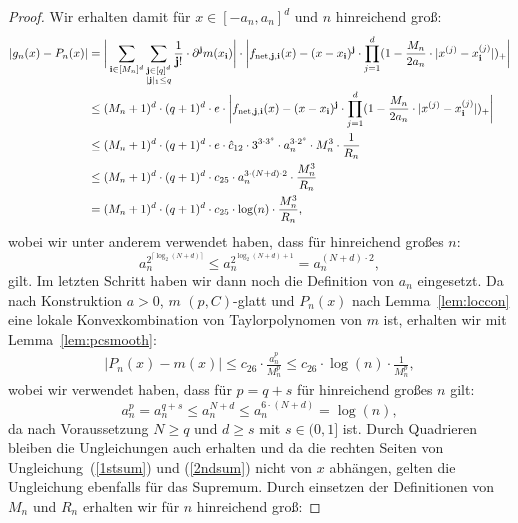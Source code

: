 \begin{proof}
Wir erhalten damit für $x \in [-a_n ,a_n]^d$ und $n$ hinreichend groß:
\begin{equation}
\label{1stsum}
\begin{split}
 |g_n(x) - P_n(x)| 
& = \bigg| \sum_{\mathbf{i} \in [M_n]^d} \sum_{\substack{ \mathbf{j} \in [q]^d \\ |\mathbf{j}|_1 \leq q}} \frac{1}{\mathbf{j}!} \cdot \partial^{\mathbf{j}} m (x_{\mathbf{i}}) \bigg| \cdot \bigg| f_{\mathrm{net},\mathbf{j},\mathbf{i}}(x) - (x - x_{\mathbf{i}})^{\mathbf{j}} \cdot \prod_{j = 1}^d(1 - \frac{M_n}{2a_n} \cdot |x^{(j)} - x_{\mathbf{i}}^{(j)}|)_+ \bigg| \\
& \leq (M_n + 1)^d \cdot (q + 1)^d \cdot e \cdot \bigg| f_{\mathrm{net},\mathbf{j},\mathbf{i}}(x) - (x - x_{\mathbf{i}})^{\mathbf{j}} \cdot \prod_{j = 1}^d(1 - \frac{M_n}{2a_n} \cdot |x^{(j)} - x_{\mathbf{i}}^{(j)}|)_+ \bigg| \\
& \leq (M_n + 1)^d \cdot (q + 1)^d \cdot e \cdot \hat{c}_{12} \cdot 3^{3 \cdot 3^s} \cdot a_n^{3 \cdot 2^s} \cdot M_n^3 \cdot \frac{1}{R_n} \\
& \leq (M_n + 1)^d \cdot (q + 1)^d \cdot c_{25}\cdot a_n^{3 \cdot (N + d) \cdot 2} \cdot \frac{M_n^3}{R_n} \\
& =  (M_n + 1)^d \cdot (q + 1)^d \cdot c_{25}\cdot \log(n) \cdot \frac{M_n^3}{R_n},
\end{split}
\end{equation}
wobei wir unter anderem verwendet haben, dass für hinreichend großes $n$:
$$a_n^{2^{\lceil\log_2(N + d)\rceil}} \leq a_n^{2^{\log_2(N + d) + 1}} = a_n^{(N + d) \cdot 2},$$ gilt. Im letzten Schritt haben wir dann noch die Definition von $a_n$ eingesetzt. 
Da nach Konstruktion $a > 0$, $m$ $(p, C)$-glatt und $P_n(x)$ nach Lemma~\ref{lem:loccon} eine lokale Konvexkombination von Taylorpolynomen von $m$ ist, erhalten wir mit Lemma~\ref{lem:pcsmooth}:
\begin{equation}
\label{2ndsum}
\begin{split}
|P_n(x) - m(x)| \leq c_{26} \cdot \frac{a_n^p}{M_n^p} \leq c_{26} \cdot \log(n) \cdot \frac{1}{M_n^p} , 
\end{split}
\end{equation}
wobei wir verwendet haben, dass für $p = q + s$ für hinreichend großes $n$ gilt:
$$a_n^p = a_n^{q + s} \leq a_n^{N + d} \leq a_n^{6 \cdot (N + d)} = \log(n),$$
da nach Voraussetzung $N \geq q$ und $d \geq s$ mit $s \in (0, 1]$ ist.
Durch Quadrieren bleiben die Ungleichungen auch erhalten und da die rechten Seiten von Ungleichung~(\ref{1stsum}) und (\ref{2ndsum}) nicht von $x$ abhängen, gelten die Ungleichung ebenfalls für das Supremum.   Durch einsetzen der Definitionen von $M_n$ und $R_n$ erhalten wir für $n$ hinreichend groß:

\end{proof}
